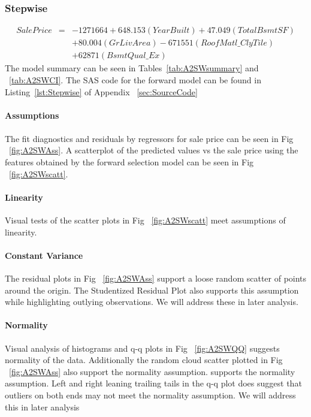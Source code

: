 \documentclass[11pt]{scrartcl} %
\begin{document}
\subsubsection{Stepwise}
\begin{eqnarray*}
SalePrice &=& -1271664 + 648.153(YearBuilt) + 47.049(TotalBsmtSF) \\
& & + 80.004(GrLivArea) - 671551(RoofMatl\_ClyTile)\\
& & + 62871(BsmtQual\_Ex)
\end{eqnarray*}
The model summary can be seen in Tables~\ref{tab:A2SWsummary} and ~\ref{tab:A2SWCI}. The SAS code for the forward model can be found in Listing~\ref{lst:Stepwise} of Appendix ~\ref{sec:SourceCode}
\paragraph{Assumptions}
\paragraph{}The fit diagnostics and residuals by regressors for sale price can be seen in Fig ~\ref{fig:A2SWAss}. A scatterplot of the predicted values vs the sale price using the features obtained by the forward selection model can be seen in Fig ~\ref{fig:A2SWscatt}.
\paragraph{Linearity} Visual tests of the scatter plots in Fig ~\ref{fig:A2SWscatt} meet assumptions of linearity.
\paragraph{Constant Variance} The residual plots in Fig ~\ref{fig:A2SWAss} support a loose random scatter of points around the origin. The Studentized Residual Plot also supports this assumption while highlighting outlying observations. We will address these in later analysis.
\paragraph{Normality} Visual analysis of histograms and q-q plots in Fig ~\ref{fig:A2SWQQ} suggests normality of the data. Additionally the random cloud scatter plotted in Fig ~\ref{fig:A2SWAss} also support the normality assumption. supports the normality assumption. Left and right leaning trailing tails in the q-q plot does suggest that outliers on both ends may not meet the normality assumption. We will address this in later analysis
\end{document}
